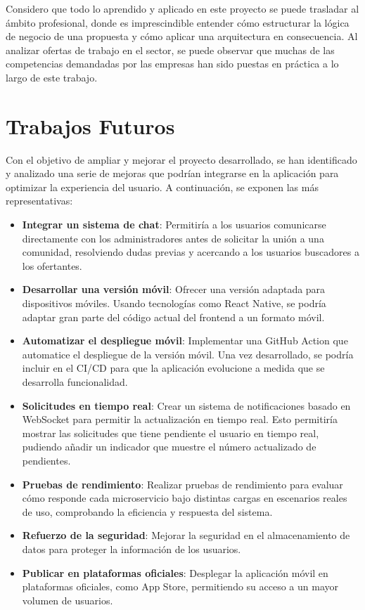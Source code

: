 Considero que todo lo aprendido y aplicado en este proyecto se puede trasladar al ámbito profesional, donde es imprescindible entender cómo estructurar la lógica de negocio de una propuesta y cómo aplicar una arquitectura en consecuencia. Al analizar ofertas de trabajo en el sector, se puede observar que muchas de las competencias demandadas por las empresas han sido puestas en práctica a lo largo de este trabajo.

\section{Trabajos Futuros}

Con el objetivo de ampliar y mejorar el proyecto desarrollado, se han identificado y analizado una serie de mejoras que podrían integrarse en la aplicación para optimizar la experiencia del usuario. A continuación, se exponen las más representativas:

\begin{itemize}
    \item \textbf{Integrar un sistema de chat}: Permitiría a los usuarios comunicarse directamente con los administradores antes de solicitar la unión a una comunidad, resolviendo dudas previas y acercando a los usuarios buscadores a los ofertantes.
    \item \textbf{Desarrollar una versión móvil}: Ofrecer una versión adaptada para dispositivos móviles. Usando tecnologías como React Native, se podría adaptar gran parte del código actual del frontend a un formato móvil.
    \item \textbf{Automatizar el despliegue móvil}: Implementar una GitHub Action que automatice el despliegue de la versión móvil. Una vez desarrollado, se podría incluir en el CI/CD para que la aplicación evolucione a medida que se desarrolla funcionalidad.
    \item \textbf{Solicitudes en tiempo real}: Crear un sistema de notificaciones basado en WebSocket para permitir la actualización en tiempo real. Esto permitiría mostrar las solicitudes que tiene pendiente el usuario en tiempo real, pudiendo añadir un indicador que muestre el número actualizado de pendientes.
    \item \textbf{Pruebas de rendimiento}: Realizar pruebas de rendimiento para evaluar cómo responde cada microservicio bajo distintas cargas en escenarios reales de uso, comprobando la eficiencia y respuesta del sistema.
    \item \textbf{Refuerzo de la seguridad}: Mejorar la seguridad en el almacenamiento de datos para proteger la información de los usuarios.
    \item \textbf{Publicar en plataformas oficiales}: Desplegar la aplicación móvil en plataformas oficiales, como App Store, permitiendo su acceso a un mayor volumen de usuarios.
\end{itemize}

